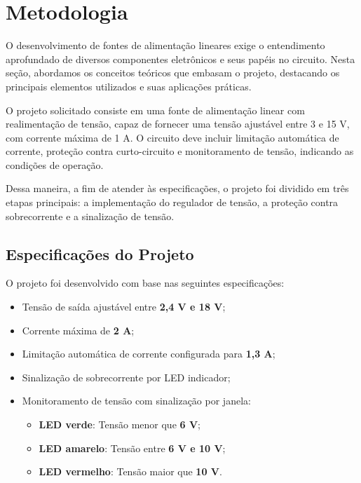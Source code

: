 \section{Metodologia}

O desenvolvimento de fontes de alimentação lineares exige o entendimento aprofundado de diversos componentes eletrônicos e seus papéis no circuito. Nesta seção, abordamos os conceitos teóricos que embasam o projeto, destacando os principais elementos utilizados e suas aplicações práticas.

O projeto solicitado consiste em uma fonte de alimentação linear com realimentação de tensão, capaz de fornecer uma tensão ajustável entre 3 e 15 V, com corrente máxima de 1 A. O circuito deve incluir limitação automática de corrente, proteção contra curto-circuito e monitoramento de tensão, indicando as condições de operação.

Dessa maneira, a fim de atender às especificações, o projeto foi dividido em três etapas principais: a implementação do regulador de tensão, a proteção contra sobrecorrente e a sinalização de tensão.

\subsection{Especificações do Projeto}

O projeto foi desenvolvido com base nas seguintes especificações:

\begin{itemize}
    \item Tensão de saída ajustável entre \textbf{2,4 V e 18 V};
    \item Corrente máxima de \textbf{2 A};
    \item Limitação automática de corrente configurada para \textbf{1,3 A};
    \item Sinalização de sobrecorrente por LED indicador;
    \item Monitoramento de tensão com sinalização por janela:
    \begin{itemize}
        \item \textbf{LED verde}: Tensão menor que \textbf{6 V};
        \item \textbf{LED amarelo}: Tensão entre \textbf{6 V e 10 V};
        \item \textbf{LED vermelho}: Tensão maior que \textbf{10 V}.
    \end{itemize}
\end{itemize}

